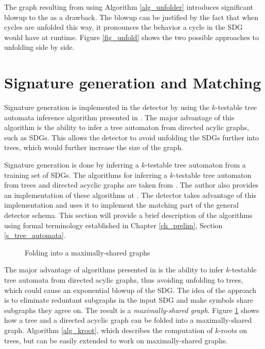 The graph resulting from using Algorithm \ref{alg_unfolder} introduces significant blowup to the  as a drawback. The blowup can be justified by the fact that when cycles are unfolded this way, it pronounces the behavior a cycle in the \textsc{SDG} would have at runtime. Figure \ref{fig_unfold} shows the two possible approaches to unfolding side by side.

\section{Signature generation and Matching}
\label{s_inference}
Signature generation is implemented in the detector by using the $k$-testable tree automata inference algorithm presented in \cite{Babic11}. The major advantage of this algorithm is the ability to infer a tree automaton from directed acylic graphs, such as \textsc{SDG}s. This allows the detector to avoid unfolding the \textsc{SDG}s further into trees, which would further increase the size of the graph. 


Signature generation is done by inferring a $k$-testable tree automaton from a training set of \textsc{SDG}s. The algorithms for inferring a $k$-testable tree automaton from trees and directed acyclic graphs are taken from \cite{Babic11}. The author also provides an implementation of these algorithms at \cite{BabicWWW}. The detector takes advantage of this implementation and uses it to implement the matching part of the general detector schema.
This section will provide a brief description of the algorithms using formal terminology established in Chapter \ref{ch_prelim}, Section \ref{s_tree_automata}.

\begin{figure}[H]
    \centering
    \caption{Folding into a maximally-shared graphs}
    \label{fig_msg}
\end{figure}

The major advantage of algorithms presented in \cite{Babic11} is the ability to infer $k$-testable tree automata from directed acylic graphs, thus avoiding unfolding to trees, which could cause an exponential blowup of the \textsc{SDG}. The idea of the approach is to eliminate reduntant subgraphs in the input \textsc{SDG} and make symbols share subgraphs they agree on. The result is a \emph{maximally-shared graph}.
Figure \ref{fig_msg} shows how a tree and a directed acyclic graph can be folded into a maximally-shared graph. Algorithm \ref{alg_kroot}, which describes the computation of $k$-roots on trees, but can be easily extended to work on maximally-shared graphs.

